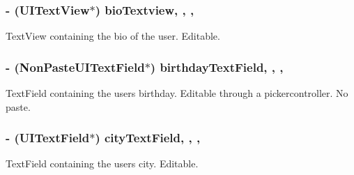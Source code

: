 \subsubsection[{bio\+Textview}]{\setlength{\rightskip}{0pt plus 5cm}-\/ (U\+I\+Text\+View$\ast$) bio\+Textview\hspace{0.3cm}{\ttfamily [read]}, {\ttfamily [write]}, {\ttfamily [nonatomic]}, {\ttfamily [strong]}}\label{interface_e_s_edit_profile_view_controller_aab037f90001248fedf0052e42d660726}
Text\+View containing the bio of the user. Editable. \hypertarget{interface_e_s_edit_profile_view_controller_a6d4ac47ac928b5675fe6532c139e7778}{}
\subsubsection[{birthday\+Text\+Field}]{\setlength{\rightskip}{0pt plus 5cm}-\/ ({\bf Non\+Paste\+U\+I\+Text\+Field}$\ast$) birthday\+Text\+Field\hspace{0.3cm}{\ttfamily [read]}, {\ttfamily [write]}, {\ttfamily [nonatomic]}, {\ttfamily [strong]}}\label{interface_e_s_edit_profile_view_controller_a6d4ac47ac928b5675fe6532c139e7778}
Text\+Field containing the user\textquotesingle{}s birthday. Editable through a pickercontroller. No paste. \hypertarget{interface_e_s_edit_profile_view_controller_acf7c129a7fd548af3eed01e0023af362}{}
\subsubsection[{city\+Text\+Field}]{\setlength{\rightskip}{0pt plus 5cm}-\/ (U\+I\+Text\+Field$\ast$) city\+Text\+Field\hspace{0.3cm}{\ttfamily [read]}, {\ttfamily [write]}, {\ttfamily [nonatomic]}, {\ttfamily [strong]}}\label{interface_e_s_edit_profile_view_controller_acf7c129a7fd548af3eed01e0023af362}
Text\+Field containing the user\textquotesingle{}s city. Editable. \hypertarget{interface_e_s_edit_profile_view_controller_a8f938b0e95d8fa36867f783fb2191a2f}{}
